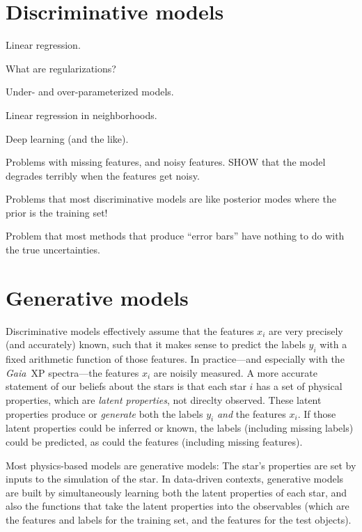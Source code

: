 \documentclass[modern]{aastex631}
\newcommand{\project}[1]{\textsl{#1}}
\newcommand{\Gaia}{\project{Gaia}}
\begin{document}
\section{Discriminative models}

Linear regression.

What are regularizations?

Under- and over-parameterized models.

Linear regression in neighborhoods.

Deep learning (and the like).

Problems with missing features, and noisy features. SHOW that the model degrades terribly when the features get noisy.

Problems that most discriminative models are like posterior modes where the prior is the training set!

Problem that most methods that produce ``error bars'' have nothing to do with the true uncertainties.

\section{Generative models}

Discriminative models effectively assume that the features $x_i$ are very precisely (and accurately) known, such that it makes sense to predict the labels $y_i$ with a fixed arithmetic function of those features.
In practice---and especially with the \Gaia\ XP spectra---the features $x_i$ are noisily measured.
A more accurate statement of our beliefs about the stars is that each star $i$ has a set of physical properties, which are \emph{latent properties}, not direclty observed.
These latent properties produce or \emph{generate} both the labels $y_i$ \emph{and} the features $x_i$.
If those latent properties could be inferred or known, the labels (including missing labels) could be predicted, as could the features (including missing features).

Most physics-based models are generative models:
The star's properties are set by inputs to the simulation of the star.
In data-driven contexts, generative models are built by simultaneously learning both the latent properties of each star, and also the functions that take the latent properties into the observables (which are the features and labels for the training set, and the features for the test objects).
\end{document}
